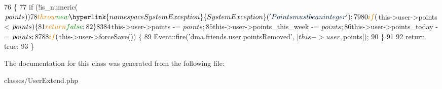 \begin{DoxyCode}
76     \{
77         \textcolor{keywordflow}{if} (!is\_numeric($points))
78             \textcolor{keywordflow}{throw} \textcolor{keyword}{new} \hyperlink{namespaceSystemException}{SystemException}(\textcolor{stringliteral}{'Points must be an integer'});
79 
80         \textcolor{keywordflow}{if} ($this->user->points < $points) \{
81             \textcolor{keywordflow}{return} \textcolor{keyword}{false};
82         \}
83 
84         $this->user->points -= $points;        
85         $this->user->points\_this\_week -= $points;
86         $this->user->points\_today -= $points;
87         
88         \textcolor{keywordflow}{if} ($this->user->forceSave()) \{
89             Event::fire(\textcolor{stringliteral}{'dma.friends.user.pointsRemoved'}, [$this->user, $points]);
90         \}
91 
92         \textcolor{keywordflow}{return} \textcolor{keyword}{true};
93     \}
\end{DoxyCode}


The documentation for this class was generated from the following file\+:\begin{DoxyCompactItemize}
\item 
classes/User\+Extend.\+php\end{DoxyCompactItemize}
